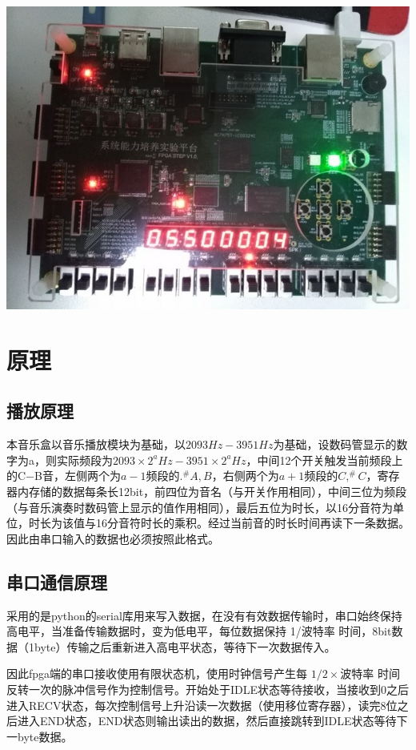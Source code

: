 \documentclass{ctexart}
\begin{document}
\begin{enumerate}
		\includegraphics[width=.7\textwidth]{write.jpg}
	\end{enumerate}
	\section{原理}
	\subsection{播放原理}
	本音乐盒以音乐播放模块为基础，以$2093Hz-3951Hz$为基础，设数码管显示的数字为a，则实际频段为$2093 \times 2^a Hz - 3951 \times 2^a Hz$，中间12个开关触发当前频段上的C$-$B音，左侧两个为$a-1$频段的$ .^\# A, B$，右侧两个为$a+1$频段的$C, ^\# C$，寄存器内存储的数据每条长12bit，前四位为音名（与开关作用相同），中间三位为频段（与音乐演奏时数码管上显示的值作用相同），最后五位为时长，以16分音符为单位，时长为该值与16分音符时长的乘积。经过当前音的时长时间再读下一条数据。因此由串口输入的数据也必须按照此格式。
	\subsection{串口通信原理}
	采用的是python的serial库用来写入数据，在没有有效数据传输时，串口始终保持高电平，当准备传输数据时，变为低电平，每位数据保持 1/波特率 时间，8bit数据（1byte）传输之后重新进入高电平状态，等待下一次数据传入。

	因此fpga端的串口接收使用有限状态机，使用时钟信号产生每 $1/2\times$波特率 时间反转一次的脉冲信号作为控制信号。开始处于IDLE状态等待接收，当接收到0之后进入RECV状态，每次控制信号上升沿读一次数据（使用移位寄存器），读完8位之后进入END状态，END状态则输出读出的数据，然后直接跳转到IDLE状态等待下一byte数据。
\end{document}
